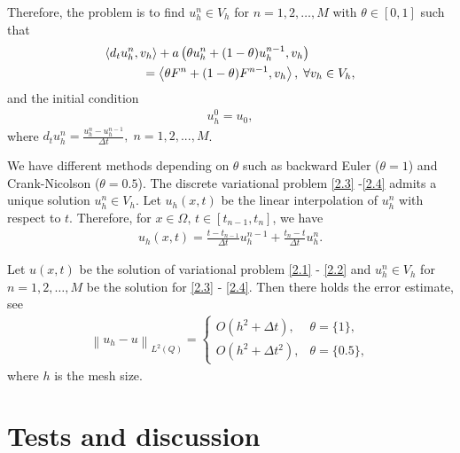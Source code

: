\documentclass[twocolumn]{article}
\begin{document}
Therefore, the problem is to find $u^n_h\in V_h$ for $n=1, 2, \dots, M$ with $\theta \in [0, 1]$ such that
\begin{align}\label{2.3}
	&\langle d_tu^n_h, v_h \rangle+a\left(\theta u^n_h+(1-\theta)u^{n-1}_h, v_h\right)\notag\\
	&\qquad\quad=\left\langle \theta F^n+(1-\theta)F^{n-1}, v_h \right\rangle, \; \forall v_h\in V_h,
\end{align}
and the initial condition 
\begin{align}\label{2.4}
	u^0_h=u_0,
\end{align}
where $d_tu^n_h=\frac{u^n_h-u^{n-1}_h}{\Delta t}, \; n=1, 2, ..., M$.

We have different methods depending on $\theta$ such as backward Euler ($\theta=1$) and Crank-Nicolson ($\theta=0.5$). The discrete variational problem \eqref{2.3} -\eqref{2.4} admits a unique solution $u^n_h\in V_h$. Let $u_h(x, t)$ be the linear interpolation of $u_h^n$ with respect to $t$. Therefore, for $x\in \Omega,\, t\in [t_{n-1}, t_n]$, we have
\begin{align*}
	u_h(x, t)=\frac{t-t_{n-1}}{\Delta t}u_h^{n-1}+\frac{t_n-t}{\Delta t}u_h^{n}.
\end{align*}
\begin{dl}\label{dl2.1}
	Let $u(x, t)$ be the solution of variational problem \eqref{2.1} - \eqref{2.2} and $u^n_h\in V_h$ for $n=1, 2, \dots, M$ be the solution for \eqref{2.3} - \eqref{2.4}. Then there holds the error estimate, see \cite{C87}
	\begin{align}\label{2.5}
		\left\|u_h-u\right\|_{L^2(Q)}=
		\begin{cases}
			O\left(h^2+\Delta t\right), &\theta=\{1\},\\
			O\left(h^2+\Delta t^2\right), &\theta=\{0.5\},
		\end{cases}		
	\end{align}
	where $h$ is the mesh size.
\end{dl}


\section{Tests and discussion}


\end{document}
